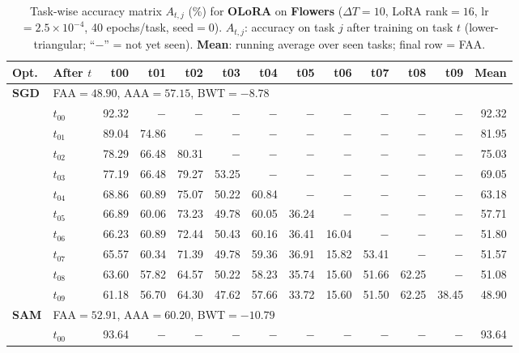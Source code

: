 \begin{table}[ht]
\centering
\caption{%
  Task-wise accuracy matrix $A_{t,j}$ (\%) for \textbf{OLoRA} on \textbf{Flowers} ($\Delta T=10$, LoRA rank$=16$, lr$=2.5\times10^{-4}$, 40 epochs/task, seed$=0$).
  $A_{t,j}$: accuracy on task $j$ after training on task $t$  (lower-triangular; ``$-$'' = not yet seen).
  \textbf{Mean}: running average over seen tasks; final row = FAA.
}
\label{tab:raw_olora_flowers}
\setlength{\tabcolsep}{2.8pt}
\renewcommand{\arraystretch}{0.88}
\scriptsize
\begin{tabular}{@{}l l r r r r r r r r r r r@{}}
\toprule
\textbf{Opt.} & \textbf{After $t$} & \textbf{t00} & \textbf{t01} & \textbf{t02} & \textbf{t03} & \textbf{t04} & \textbf{t05} & \textbf{t06} & \textbf{t07} & \textbf{t08} & \textbf{t09} & \textbf{Mean} \\
\midrule
\multirow{11}{*}{\textbf{SGD}} & \multicolumn{12}{l}{\quad\small FAA$=48.90$,\; AAA$=57.15$,\; BWT$=-8.78$} \\
 & $t_{00}$ & 92.32 & $-$ & $-$ & $-$ & $-$ & $-$ & $-$ & $-$ & $-$ & $-$ & 92.32 \\
 & $t_{01}$ & 89.04 & 74.86 & $-$ & $-$ & $-$ & $-$ & $-$ & $-$ & $-$ & $-$ & 81.95 \\
 & $t_{02}$ & 78.29 & 66.48 & 80.31 & $-$ & $-$ & $-$ & $-$ & $-$ & $-$ & $-$ & 75.03 \\
 & $t_{03}$ & 77.19 & 66.48 & 79.27 & 53.25 & $-$ & $-$ & $-$ & $-$ & $-$ & $-$ & 69.05 \\
 & $t_{04}$ & 68.86 & 60.89 & 75.07 & 50.22 & 60.84 & $-$ & $-$ & $-$ & $-$ & $-$ & 63.18 \\
 & $t_{05}$ & 66.89 & 60.06 & 73.23 & 49.78 & 60.05 & 36.24 & $-$ & $-$ & $-$ & $-$ & 57.71 \\
 & $t_{06}$ & 66.23 & 60.89 & 72.44 & 50.43 & 60.16 & 36.41 & 16.04 & $-$ & $-$ & $-$ & 51.80 \\
 & $t_{07}$ & 65.57 & 60.34 & 71.39 & 49.78 & 59.36 & 36.91 & 15.82 & 53.41 & $-$ & $-$ & 51.57 \\
 & $t_{08}$ & 63.60 & 57.82 & 64.57 & 50.22 & 58.23 & 35.74 & 15.60 & 51.66 & 62.25 & $-$ & 51.08 \\
 & $t_{09}$ & 61.18 & 56.70 & 64.30 & 47.62 & 57.66 & 33.72 & 15.60 & 51.50 & 62.25 & 38.45 & 48.90 \\
\midrule
\multirow{11}{*}{\textbf{SAM}} & \multicolumn{12}{l}{\quad\small FAA$=52.91$,\; AAA$=60.20$,\; BWT$=-10.79$} \\
 & $t_{00}$ & 93.64 & $-$ & $-$ & $-$ & $-$ & $-$ & $-$ & $-$ & $-$ & $-$ & 93.64 \\

\end{tabular}
\end{table}
